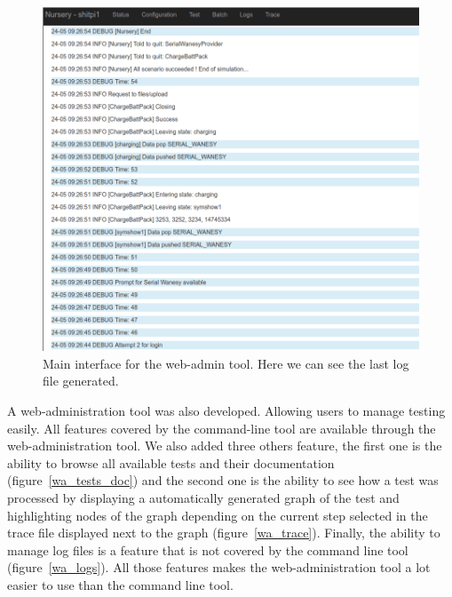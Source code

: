 \documentclass[12pt]{article}
\theoremstyle{definition}
\theoremstyle{definition}
\begin{document}
\begin{figure}
    \centering
    \includegraphics[scale=0.4]{wa_status.png}
    \caption{Main interface for the web-admin tool. Here we can see the last log file generated.}
    \label{wa_status}
\end{figure}

A web-administration tool was also developed. Allowing users to manage testing easily. All features covered by the command-line tool are available through the web-administration tool. We also added three others feature, the first one is the ability to browse all available tests and their documentation (figure~\ref{wa_tests_doc}) and the second one is the ability to see how a test was processed by displaying a automatically generated graph of the test and highlighting nodes of the graph depending on the current step selected in the trace file displayed next to the graph (figure~\ref{wa_trace}). Finally, the ability to manage log files is a feature that is not covered by the command line tool (figure~\ref{wa_logs}). All those features makes the web-administration tool a lot easier to use than the command line tool.\\
\end{document}
